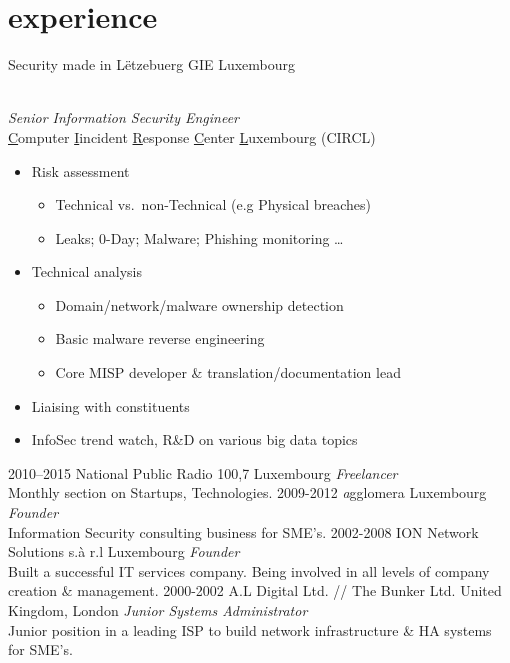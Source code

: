 \documentclass[]{friggeri-cv} %
\begin{document}
\section{experience}
\begin{entrylist}
{Security made in L\"{e}tzebuerg GIE}
{Luxembourg}
{\\
\emph{Senior Information Security Engineer} \\
\underline{C}omputer \underline{I}incident \underline{R}esponse \underline{C}enter \underline{L}uxembourg (CIRCL)
\begin{itemize}
    \item Risk assessment
    \begin{itemize}
        \item Technical vs.\ non-Technical (e.g Physical breaches)
        \item Leaks; 0-Day; Malware; Phishing monitoring \ldots
    \end{itemize}
    \item Technical analysis
    \begin{itemize}
        \item Domain/network/malware ownership detection
        \item Basic malware reverse engineering
        \item Core MISP developer \& translation/documentation lead
    \end{itemize}
    \item Liaising with constituents
    \item InfoSec trend watch, R\&D on various big data topics
\end{itemize}
}
\entry
{2010--2015}
{National Public Radio 100,7}
{Luxembourg}
{\emph{Freelancer} \\
Monthly section on Startups, Technologies.}
\entry
{2009-2012}
{\emph{a}gglomera}
{Luxembourg}
{\emph{Founder} \\
Information Security consulting business for SME's.}
\entry
{2002-2008}
{ION Network Solutions s.\`{a} r.l}
{Luxembourg}
{\emph{Founder} \\
Built a successful IT services company. Being involved in all levels of company creation \& management.}
\entry
{2000-2002}
{A.L Digital Ltd. // The Bunker Ltd.}
{United Kingdom, London}
{\emph{Junior Systems Administrator} \\
Junior position in a leading ISP to build network infrastructure \& HA systems for SME's.}
\end{entrylist}
\end{document}
